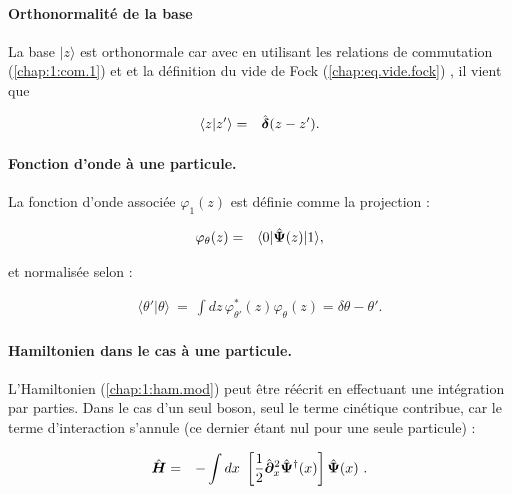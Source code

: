 \paragraph{Orthonormalité de la base}

La base $\vert z \rangle$ est orthonormale car avec en utilisant les relations de commutation (\ref{chap:1:com.1}) et et la définition du vide de Fock (\ref{chap:eq.vide.fock}) , il vient que 

\begin{eqnarray}
	\langle z\vert z' \rangle  & = & \hat{\bm{\delta}}(z -z').
\end{eqnarray}


\paragraph{Fonction d’onde à une particule.}

La fonction d’onde associée \(\varphi_1(z)\) est définie comme la projection :

\begin{eqnarray}
	\varphi_{\theta}(z) & = & \langle 0 \vert \hat{\bm{\Psi}}(z) \vert 1 \rangle,
\end{eqnarray}

et normalisée selon :

\begin{eqnarray}
	\langle \theta' \vert \theta \rangle ~=~ \int dz\,  \varphi_{\theta'}^\ast(z)\varphi_{\theta}(z) = \delta{\theta - \theta'}.
\end{eqnarray}

\paragraph{Hamiltonien dans le cas à une particule.}

L'Hamiltonien (\ref{chap:1:ham.mod}) peut être réécrit en effectuant une intégration par parties. Dans le cas d'un seul boson, seul le terme cinétique contribue, car le terme d'interaction s'annule (ce dernier étant nul pour une seule particule) :


\begin{eqnarray}
	\operator{H} & = & -\int dx  \left [\frac{1}{2}\operator{\partial}_x^2 \operator{\Psi}^\dag(x)\right ] \operator{\Psi}(x)  \label{chap:1:ham.mod.1.part.2}.
\end{eqnarray}


